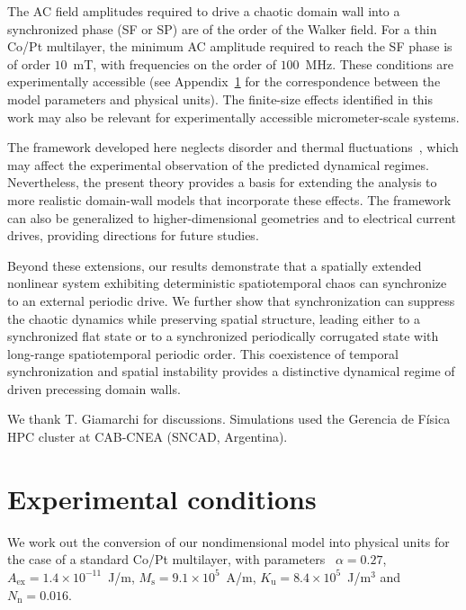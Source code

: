 \documentclass[prb,aps,twocolumn,superscriptaddress,floatfix]{revtex4-2}
\begin{document}
The AC field amplitudes required to drive a chaotic domain wall into a synchronized phase (SF or SP) are of the order of the Walker field. For a thin Co/Pt multilayer, the minimum AC amplitude required to reach the SF phase is of order $10$~mT, with frequencies on the order of $100$~MHz. These conditions are experimentally accessible (see Appendix~\ref{ap:exp_cond} for the correspondence between the model parameters and physical units). The finite-size effects identified in this work may also be relevant for experimentally accessible micrometer-scale systems.

The framework developed here neglects disorder and thermal fluctuations~\cite{ferre2013,ferrero2021creep}, which may affect the experimental observation of the predicted dynamical regimes. Nevertheless, the present theory provides a basis for extending the analysis to more realistic domain-wall models that incorporate these effects. The framework can also be generalized to higher-dimensional geometries and to electrical current drives, providing directions for future studies.

Beyond these extensions, our results demonstrate that a spatially extended nonlinear system exhibiting deterministic spatiotemporal chaos can synchronize to an external periodic drive. We further show that synchronization can suppress the chaotic dynamics while preserving spatial structure, leading either to a synchronized flat state or to a synchronized periodically corrugated state with long-range spatiotemporal periodic order. This coexistence of temporal synchronization and spatial instability provides a distinctive dynamical regime of driven precessing domain walls.

\begin{acknowledgments}
We thank T. Giamarchi for discussions. Simulations used the Gerencia de Física HPC cluster at CAB-CNEA (SNCAD, Argentina).
\end{acknowledgments}

\appendix

\section{Experimental conditions}
\label{ap:exp_cond}

We work out the conversion of our nondimensional model into physical units for the case of a standard Co/Pt multilayer, with parameters~\cite{skaugen2019} $\alpha=0.27$, $A_\text{ex}=1.4 \times 10^{-11}$~J/m, $M_\text{s}=9.1\times 10^5$~A/m, $K_\text{u}=8.4\times 10 ^5$~J/m$^3$ and $N_\text{n}=0.016$.
\end{document}
